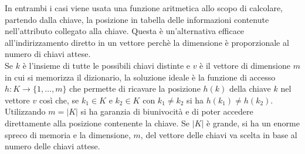 \documentclass[12pt]{report}
\begin{document}
	In entrambi i casi viene usata una funzione aritmetica allo scopo di calcolare, partendo dalla chiave, la posizione in tabella delle informazioni contenute nell'attributo collegato alla chiave. Questa è un'alternativa efficace all'indirizzamento diretto in un vettore perchè la dimensione è proporzionale al numero di chiavi attese. \\
	Se $k$ è l'insieme di tutte le possibili chiavi distinte e $v$ è il vettore di dimensione $m$ in cui si memorizza il dizionario, la soluzione ideale è la funzione di accesso $h: K \to \{1, \dots, m\}$ che permette di ricavare la posizione $h(k)$ della chiave $k$ nel vettore $v$ così che, se $k_1 \in K$ e $k_2 \in K$ con $k_1 \neq k_2$ si ha $h(k_1) \neq h(k_2)$. \\
	Utilizzando $m = |K|$ si ha garanzia di biunivocità e di poter accedere direttamente alla posizione contenente la chiave. Se $|K|$ è grande, si ha un enorme spreco di memoria e la dimensione, $m$, del vettore delle chiavi va scelta in base al numero delle chiavi attese.
\end{document}
